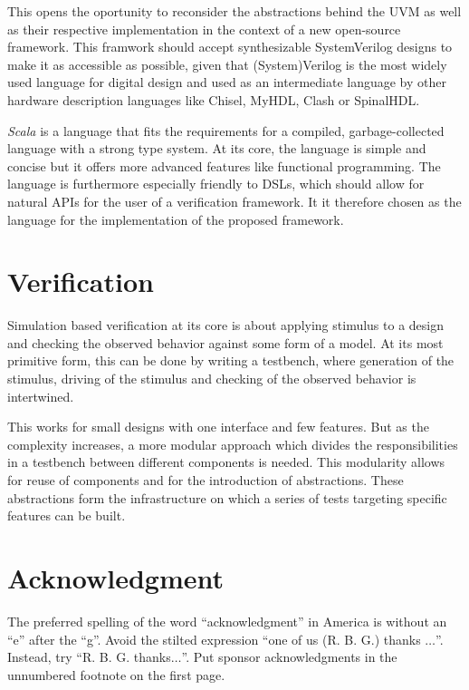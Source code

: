\documentclass[conference]{IEEEtran}
\begin{document}
This opens the oportunity to reconsider the abstractions behind the UVM as well as their respective implementation in the context of a new open-source framework. This framwork should accept synthesizable SystemVerilog designs to make it as accessible as possible, given that (System)Verilog is the most widely used language for digital design and used as an intermediate language by other hardware description languages like Chisel, MyHDL, Clash or SpinalHDL.

\textit{Scala} is a language that fits the requirements for a compiled, garbage-collected language with a strong type system. At its core, the language is simple and concise but it offers more advanced features like functional programming. The language is furthermore especially friendly to DSLs, which should allow for natural APIs for the user of a verification framework. It it therefore chosen as the language for the implementation of the proposed framework.

\section{Verification}

Simulation based verification at its core is about applying stimulus to a design and checking the observed behavior against some form of a model. At its most primitive form, this can be done by writing a testbench, where generation of the stimulus, driving of the stimulus and checking of the observed behavior is intertwined. 

This works for small designs with one interface and few features. But as the complexity increases, a more modular approach which divides the responsibilities in a testbench between different components is needed. This modularity allows for reuse of components and for the introduction of abstractions. These abstractions form the infrastructure on which a series of tests targeting specific features can be built.

\section*{Acknowledgment}

The preferred spelling of the word ``acknowledgment'' in America is without 
an ``e'' after the ``g''. Avoid the stilted expression ``one of us (R. B. 
G.) thanks $\ldots$''. Instead, try ``R. B. G. thanks$\ldots$''. Put sponsor 
acknowledgments in the unnumbered footnote on the first page.
\end{document}
